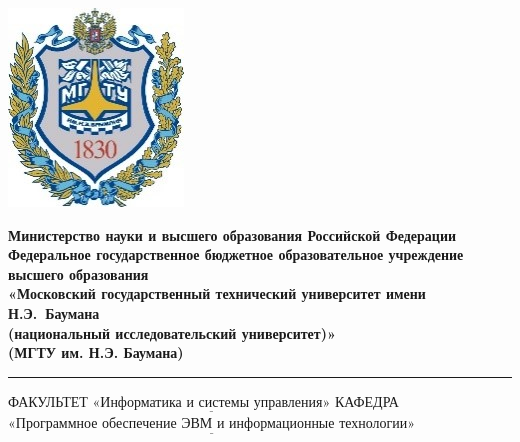 \documentclass[12pt]{report}
\begin{document}
\thispagestyle{empty}
\begin{titlepage}
	\noindent \begin{minipage}{0.15\textwidth}
	\includegraphics[width=\linewidth]{./inc/img/b_logo.jpg}
	\end{minipage}
	\noindent\begin{minipage}{0.9\textwidth}\centering
		\textbf{Министерство науки и высшего образования Российской Федерации}\\
		\textbf{Федеральное государственное бюджетное образовательное учреждение высшего образования}\\
		\textbf{«Московский государственный технический университет имени Н.Э.~Баумана}\\
		\textbf{(национальный исследовательский университет)»}\\
		\textbf{(МГТУ им. Н.Э. Баумана)}
	\end{minipage}
	
	\noindent\rule{18cm}{3pt}
	\newline\newline
	\noindent ФАКУЛЬТЕТ $\underline{\text{«Информатика и системы управления»}}$ \newline\newline
	\noindent КАФЕДРА $\underline{\text{«Программное обеспечение ЭВМ и информационные технологии»}}$\newline\newline\newline\newline\newline
	

\end{titlepage}
\end{document}
